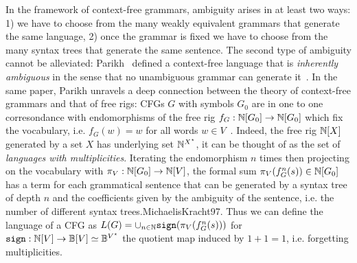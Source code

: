 In the framework of context-free grammars, ambiguity arises in at least two ways: 1) we have to choose from the many weakly equivalent grammars that generate the same language, 2) once the grammar is fixed we have to choose from the many syntax trees that generate the same sentence.
The second type of ambiguity cannot be alleviated: Parikh~\cite{Parikh61,Parikh66} defined a context-free language that is \emph{inherently ambiguous} in the sense that no unambiguous grammar can generate it~\cite[Theorem~29]{Chomsky63}.
In the same paper, Parikh unravels a deep connection between the theory of context-free grammars and that of free rigs: CFGs $G$ with symbols $G_0$ are in one to one corresondance with endomorphisms of the free rig $f_G : \mathbb{N}[G_0] \to \mathbb{N}[G_0]$ which fix the vocabulary, i.e. $f_G(w) = w$ for all words $w \in V$~\cite[Section~3]{Parikh66}.
Indeed, the free rig $\mathbb{N}[X]$ generated by a set $X$ has underlying set $\mathbb{N}^{X^\star}$, it can be thought of as the set of \emph{languages with multiplicities}.
Iterating the endomorphism $n$ times then projecting on the vocabulary with $\pi_V : \mathbb{N}[G_0] \to \mathbb{N}[V]$, the formal sum $\pi_V(f_G^n(s)) \in \mathbb{N}[G_0]$ has a term for each grammatical sentence that can be generated by a syntax tree of depth $n$ and the coefficients given by the ambiguity of the sentence, i.e. the number of different syntax trees.MichaelisKracht97.
Thus we can define the language of a CFG as $L(G) = \cup_{n \in \mathbb{N}} \mathtt{sign}(\pi_V(f_G^n(s)))$ for $\mathtt{sign} : \mathbb{N}[V] \to \mathbb{B}[V] \simeq \mathbb{B}^{V^\star}$ the quotient map induced by $1 + 1 = 1$, i.e. forgetting multiplicities.

